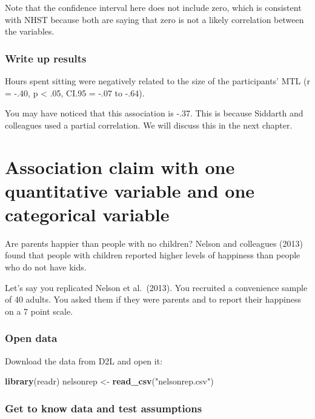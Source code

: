 \documentclass[
]{book}
\newenvironment{Shaded}{\begin{snugshade}}{\end{snugshade}}
\newcommand{\KeywordTok}[1]{\textcolor[rgb]{0.13,0.29,0.53}{\textbf{#1}}}
\newcommand{\NormalTok}[1]{#1}
\newcommand{\StringTok}[1]{\textcolor[rgb]{0.31,0.60,0.02}{#1}}
\begin{document}
Note that the confidence interval here does not include zero, which is consistent with NHST because both are saying that zero is not a likely correlation between the variables.

\hypertarget{write-up-results}{%
\subsubsection{Write up results}\label{write-up-results}}

Hours spent sitting were negatively related to the size of the participants' MTL (r = -.40, p \textless{} .05, CI.95 = -.07 to -.64).

You may have noticed that this association is -.37. This is because Siddarth and colleagues used a partial correlation. We will discuss this in the next chapter.

\hypertarget{association-claim-with-one-quantitative-variable-and-one-categorical-variable}{%
\section{Association claim with one quantitative variable and one categorical variable}\label{association-claim-with-one-quantitative-variable-and-one-categorical-variable}}

Are parents happier than people with no children? Nelson and colleagues (2013) found that people with children reported higher levels of happiness than people who do not have kids.

Let's say you replicated Nelson et al.~(2013). You recruited a convenience sample of 40 adults. You asked them if they were parents and to report their happiness on a 7 point scale.

\hypertarget{open-data-1}{%
\subsubsection{Open data}\label{open-data-1}}

Download the data from D2L and open it:

\begin{Shaded}
\begin{Highlighting}[]
\KeywordTok{library}\NormalTok{(readr)}
\NormalTok{nelsonrep <-}\StringTok{ }\KeywordTok{read_csv}\NormalTok{(}\StringTok{"nelsonrep.csv"}\NormalTok{)}
\end{Highlighting}
\end{Shaded}

\hypertarget{get-to-know-data-and-test-assumptions-1}{%
\subsubsection{Get to know data and test assumptions}\label{get-to-know-data-and-test-assumptions-1}}
\end{document}
